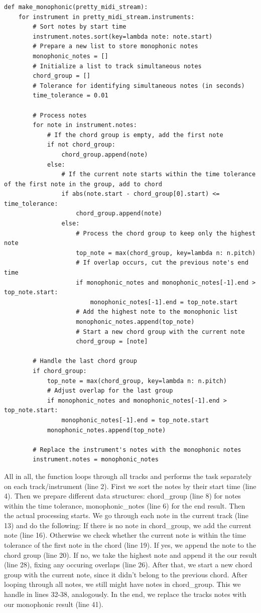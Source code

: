 \documentclass[a4paper,12pt]{extarticle}
\begin{document}
\begin{lstlisting}
def make_monophonic(pretty_midi_stream):
    for instrument in pretty_midi_stream.instruments:
        # Sort notes by start time
        instrument.notes.sort(key=lambda note: note.start)
        # Prepare a new list to store monophonic notes
        monophonic_notes = []
        # Initialize a list to track simultaneous notes
        chord_group = []
        # Tolerance for identifying simultaneous notes (in seconds)
        time_tolerance = 0.01

        # Process notes
        for note in instrument.notes:
            # If the chord group is empty, add the first note
            if not chord_group:
                chord_group.append(note)
            else:
                # If the current note starts within the time tolerance of the first note in the group, add to chord
                if abs(note.start - chord_group[0].start) <= time_tolerance:
                    chord_group.append(note)
                else:
                    # Process the chord group to keep only the highest note
                    top_note = max(chord_group, key=lambda n: n.pitch)
                    # If overlap occurs, cut the previous note's end time
                    if monophonic_notes and monophonic_notes[-1].end > top_note.start:
                        monophonic_notes[-1].end = top_note.start
                    # Add the highest note to the monophonic list
                    monophonic_notes.append(top_note)
                    # Start a new chord group with the current note
                    chord_group = [note]

        # Handle the last chord group
        if chord_group:
            top_note = max(chord_group, key=lambda n: n.pitch)
            # Adjust overlap for the last group
            if monophonic_notes and monophonic_notes[-1].end > top_note.start:
                monophonic_notes[-1].end = top_note.start
            monophonic_notes.append(top_note)

        # Replace the instrument's notes with the monophonic notes
        instrument.notes = monophonic_notes
\end{lstlisting}
All in all, the function loops through all tracks and performs the task separately on each track/instrument (line 2). First we sort the notes by their start time (line 4). Then we prepare different data structures: chord\_group (line 8) for notes within the time tolerance, monophonic\_notes (line 6) for the end result. Then the actual processing starts. We go through each note in the current track (line 13) and do the following: If there is no note in chord\_group, we add the current note (line 16). Otherwise we check whether the current note is within the time tolerance of the first note in the chord (line 19). If yes, we append the note to the chord group (line 20). If no, we take the highest note and append it the our result (line 28), fixing any occuring overlaps (line 26). After that, we start a new chord group with the current note, since it didn't belong to the previous chord. After looping through all notes, we still might have notes in chord\_group. This we handle in lines 32-38, analogously. In the end, we replace the tracks notes with our monophonic result (line 41).
\end{document}
